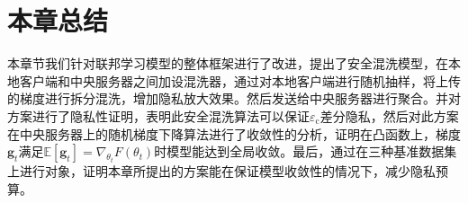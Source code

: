 \section{本章总结}
本章节我们针对联邦学习模型的整体框架进行了改进，提出了安全混洗模型，在本地客户端和中央服务器之间加设混洗器，通过对本地客户端进行随机抽样，将上传的梯度进行拆分混洗，增加隐私放大效果。然后发送给中央服务器进行聚合。并对方案进行了隐私性证明，表明此安全混洗算法可以保证$\varepsilon_{\mathrm{c}}$差分隐私，然后对此方案在中央服务器上的随机梯度下降算法进行了收敛性的分析，证明在凸函数上，梯度$\mathbf{g}_{t}$满足$\mathbb{E}\left[\mathbf{g}_{t}\right]=\nabla_{\theta_{t}} F\left(\theta_{t}\right)$时模型能达到全局收敛。最后，通过在三种基准数据集上进行对象，证明本章所提出的方案能在保证模型收敛性的情况下，减少隐私预算。


